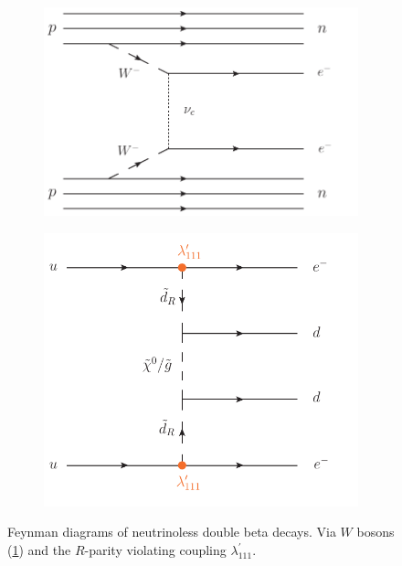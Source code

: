 \begin{figure}[ht!]
  \centering
  \begin{subfigure}[b]{0.495\textwidth}
    \centering
    \includegraphics[width=\textwidth]{plots/neutrinoless-double-beta.pdf}
    \caption{\label{fig:neutrinoless-double-beta}}
  \end{subfigure}
  \begin{subfigure}[b]{0.495\textwidth}
    \centering
    \includegraphics[width=\textwidth]{plots/neutrinoless-double-beta-lambda-prime-111.pdf}
    \caption{\label{fig:neutrinoless-double-beta-lambda-prime-111}}
  \end{subfigure}
  \caption{Feynman diagrams of neutrinoless double beta decays. Via $W$ bosons (\ref{fig:neutrinoless-double-beta}) and the $R$-parity violating coupling $\lambda^\prime_{111}$.}
  \label{fig:neutrinoless-double-beta-decays}
\end{figure}


